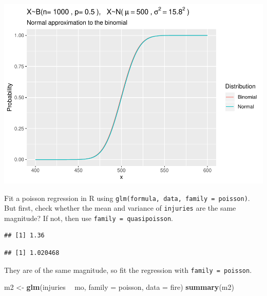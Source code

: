 \documentclass[
]{book}
\newenvironment{Shaded}{\begin{snugshade}}{\end{snugshade}}
\newcommand{\DataTypeTok}[1]{\textcolor[rgb]{0.13,0.29,0.53}{#1}}
\newcommand{\KeywordTok}[1]{\textcolor[rgb]{0.13,0.29,0.53}{\textbf{#1}}}
\newcommand{\NormalTok}[1]{#1}
\newcommand{\OperatorTok}[1]{\textcolor[rgb]{0.81,0.36,0.00}{\textbf{#1}}}
\newcommand{\StringTok}[1]{\textcolor[rgb]{0.31,0.60,0.02}{#1}}
\begin{document}
\includegraphics{data-sci_files/figure-latex/unnamed-chunk-17-1.pdf}

Fit a poisson regression in R using \texttt{glm(formula,\ data,\ family\ =\ poisson)}. But first, check whether the mean and variance of \texttt{injuries} are the same magnitude? If not, then use \texttt{family\ =\ quasipoisson}.

\begin{Shaded}
\end{Shaded}

\begin{verbatim}
## [1] 1.36
\end{verbatim}

\begin{Shaded}
\end{Shaded}

\begin{verbatim}
## [1] 1.020468
\end{verbatim}

They are of the same magnitude, so fit the regression with \texttt{family\ =\ poisson}.

\begin{Shaded}
\begin{Highlighting}[]
\NormalTok{m2 <-}\StringTok{ }\KeywordTok{glm}\NormalTok{(injuries }\OperatorTok{~}\StringTok{ }\NormalTok{mo, }\DataTypeTok{family =}\NormalTok{ poisson, }\DataTypeTok{data =}\NormalTok{ fire)}
\KeywordTok{summary}\NormalTok{(m2)}
\end{Highlighting}
\end{Shaded}
\end{document}
